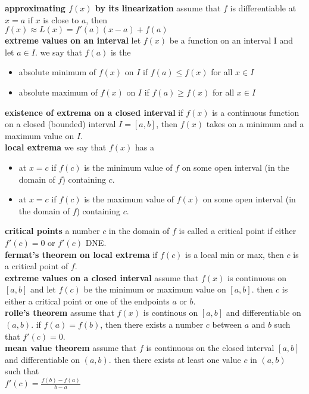 \documentclass{article}
\begin{document}
\textbf{approximating $f(x)$ by its linearization} assume that $f$ is differentiable at $x = a$ if $x$ is close to $a$, then\\ $f(x) \approx L(x) = f'(a)(x - a) + f(a)$\\

\textbf{extreme values on an interval} let $f(x)$ be a function on an interval I and let $a \in I$. we say that $f(a)$ is the
	\begin{itemize}
		\item absolute minimum of $f(x)$ on $I$ if $f(a) \leq f(x)$ for all $x \in I$
		\item absolute maximum of $f(x)$ on $I$ if $f(a) \geq f(x)$ for all $x \in I$
	\end{itemize}

\textbf{existence of extrema on a closed interval} if $f(x)$ is a continuous function on a closed (bounded) interval $I = [a, b]$, then $f(x)$ takes on a minimum and a maximum value on $I$.\\

\textbf{local extrema} we say that $f(x)$ has a
	\begin{itemize}
		\item at $x = c$ if $f(c)$ is the minimum value of $f$ on some open interval (in the domain of $f$) containing $c$.
		\item at $x = c$ if $f(c)$ is the maximum value of $f(x)$ on some open interval (in the domain of $f$) containing $c$.
	\end{itemize}

\textbf{critical points} a number $c$ in the domain of $f$ is called a critical point if either $f'(c) = 0$ or $f'(c)$ DNE.\\

\textbf{fermat's theorem on local extrema} if $f(c)$ is a local min or max, then $c$ is a critical point of $f$.\\

\textbf{extreme values on a closed interval} assume that $f(x)$ is continuous on $[a, b]$ and let $f(c)$ be the minimum or maximum value on $[a, b]$. then $c$ is either a critical point or one of the endpoints $a$ or $b$.\\

\textbf{rolle's theorem} assume that $f(x)$ is continous on $[a, b]$ and differentiable on $(a, b)$. if $f(a) = f(b)$, then there exists a number $c$ between $a$ and $b$ such that $f'(c) = 0$.\\

\textbf{mean value theorem} assume that $f$ is continuous on the closed interval $[a, b]$ and differentiable on $(a, b)$. then there exists at least one value $c$ in $(a, b)$ such that\\ $f'(c) = \frac{f(b) - f(a)}{b - a}$\\
\end{document}
